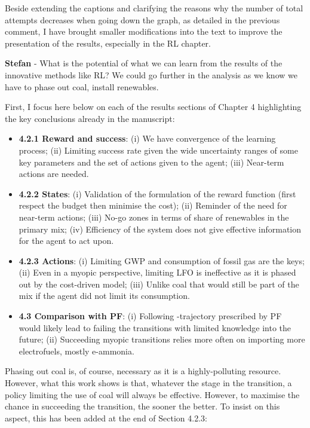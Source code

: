 \documentclass[12pt,a4paper]{article}
\begin{document}
\noindent Beside extending the captions and clarifying the reasons why the number of total attempts decreases when going down the graph, as detailed in the previous comment, I have brought smaller modifications into the text to improve the presentation of the results, especially in the RL chapter.

\begin{mdframed}[style=comment] %
{\color{teal} \textbf{Stefan}} - What is the potential of what we can learn from the results of the innovative methods like RL? We could go further in the analysis as we know we have to phase out coal, install renewables.
\end{mdframed}

\noindent First, I focus here below on each of the results sections of Chapter 4 highlighting the key conclusions already in the manuscript:

\begin{itemize}
\item \textbf{4.2.1 Reward and success}: (i) We have convergence of the learning process; (ii) Limiting success rate given the wide uncertainty ranges of some key parameters and the set of actions given to the agent; (iii) Near-term actions are needed.
\item \textbf{4.2.2 States}: (i) Validation of the formulation of the reward function (first respect the  budget then minimise the cost); (ii) Reminder of the need for near-term actions; (iii) No-go zones in terms of share of renewables in the primary mix; (iv) Efficiency of the system does not give effective information for the agent to act upon.
\item \textbf{4.2.3 Actions}: (i) Limiting GWP and consumption of fossil gas are the keys; (ii) Even in a myopic perspective, limiting LFO is ineffective as it is phased out by the cost-driven model; (iii) Unlike coal that would still be part of the mix if the agent did not limit its consumption.
\item \textbf{4.3 Comparison with PF}: (i) Following -trajectory prescribed by PF would likely lead to failing the transitions with limited knowledge into the future; (ii) Succeeding myopic transitions relies more often on importing more electrofuels, mostly e-ammonia. 
\end{itemize}

Phasing out coal is, of course, necessary as it is a highly-polluting resource. However, what this work shows is that, whatever the stage in the transition, a policy limiting the use of coal will always be effective. However, to maximise the chance in succeeding the transition, the sooner the better. To insist on this aspect, this has been added {\color{blue}at the end of Section 4.2.3}:
\end{document}
